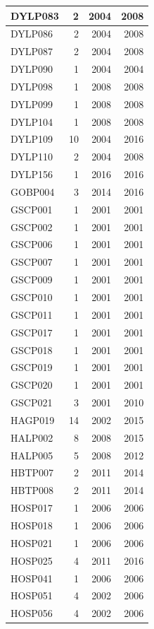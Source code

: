 \documentclass[11pt,]{book}
\begin{document}
\begin{table}
\begin{tabular}[t]{l|r|r|r}
\hline
DYLP083 & 2 & 2004 & 2008\\
\hline
DYLP086 & 2 & 2004 & 2008\\
\hline
DYLP087 & 2 & 2004 & 2008\\
\hline
DYLP090 & 1 & 2004 & 2004\\
\hline
DYLP098 & 1 & 2008 & 2008\\
\hline
DYLP099 & 1 & 2008 & 2008\\
\hline
DYLP104 & 1 & 2008 & 2008\\
\hline
DYLP109 & 10 & 2004 & 2016\\
\hline
DYLP110 & 2 & 2004 & 2008\\
\hline
DYLP156 & 1 & 2016 & 2016\\
\hline
GOBP004 & 3 & 2014 & 2016\\
\hline
GSCP001 & 1 & 2001 & 2001\\
\hline
GSCP002 & 1 & 2001 & 2001\\
\hline
GSCP006 & 1 & 2001 & 2001\\
\hline
GSCP007 & 1 & 2001 & 2001\\
\hline
GSCP009 & 1 & 2001 & 2001\\
\hline
GSCP010 & 1 & 2001 & 2001\\
\hline
GSCP011 & 1 & 2001 & 2001\\
\hline
GSCP017 & 1 & 2001 & 2001\\
\hline
GSCP018 & 1 & 2001 & 2001\\
\hline
GSCP019 & 1 & 2001 & 2001\\
\hline
GSCP020 & 1 & 2001 & 2001\\
\hline
GSCP021 & 3 & 2001 & 2010\\
\hline
HAGP019 & 14 & 2002 & 2015\\
\hline
HALP002 & 8 & 2008 & 2015\\
\hline
HALP005 & 5 & 2008 & 2012\\
\hline
HBTP007 & 2 & 2011 & 2014\\
\hline
HBTP008 & 2 & 2011 & 2014\\
\hline
HOSP017 & 1 & 2006 & 2006\\
\hline
HOSP018 & 1 & 2006 & 2006\\
\hline
HOSP021 & 1 & 2006 & 2006\\
\hline
HOSP025 & 4 & 2011 & 2016\\
\hline
HOSP041 & 1 & 2006 & 2006\\
\hline
HOSP051 & 4 & 2002 & 2006\\
\hline
HOSP056 & 4 & 2002 & 2006\\

\end{tabular}
\end{table}
\end{document}

